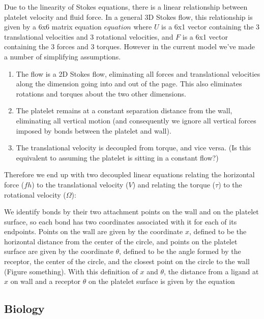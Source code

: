 Due to the linearity of Stokes equations, there is a linear
relationship between platelet velocity and fluid force. In a general
3D Stokes flow, this relationship is given by a 6x6 matrix equation
$equation$ where $U$ is a 6x1 vector containing the 3 translational
velocities and 3 rotational velocities, and $F$ is a 6x1 vector
containing the 3 forces and 3 torques. However in the current model
we've made a number of simplifying assumptions.
\begin{enumerate}
\item The flow is a 2D Stokes flow, eliminating all forces and
  translational velocities along the dimension going into and out of
  the page. This also eliminates rotations and torques about the two
  other dimensions.
\item The platelet remains at a constant separation distance from the
  wall, eliminating all vertical motion (and consequently we ignore
  all vertical forces imposed by bonds between the platelet and
  wall).
\item The translational velocity is decoupled from torque, and vice
  versa. (Is this equivalent to assuming the platelet is sitting in a
  constant flow?)
\end{enumerate}
Therefore we end up with two decoupled linear equations relating the
horizontal force ($fh$) to the translational velocity ($V$) and
relating the torque ($\tau$) to the rotational velocity ($\Omega$):

We identify bonds by their two attachment points on the wall and on
the platelet surface, so each bond has two coordinates associated with
it for each of its endpoints. Points on the wall are given by the
coordinate $x$, defined to be the horizontal distance from the center
of the circle, and points on the platelet surface are given by the
coordinate $\theta$, defined to be the angle formed by the receptor,
the center of the circle, and the closest point on the circle to the
wall (Figure something). With this definition of $x$ and $\theta$, the
distance from a ligand at $x$ on wall and a receptor $\theta$ on the
platelet surface is given by the equation

\subsection{Biology}
\label{sec:biology}

